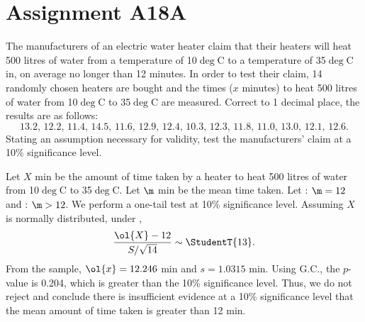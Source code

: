 \section{Assignment A18A}

\begin{problem}
    The manufacturers of an electric water heater claim that their heaters will heat 500 litres of water from a temperature of 10$\deg$C to a temperature of 35$\deg$C in, on average no longer than 12 minutes. In order to test their claim, 14 randomly chosen heaters are bought and the times ($x$ minutes) to heat 500 litres of water from 10$\deg$C to 35$\deg$C are measured. Correct to 1 decimal place, the results are as follows: \[13.2, \, 12.2, \, 11.4, \, 14.5, \, 11.6, \, 12.9, \, 12.4, \, 10.3, \, 12.3, \, 11.8, \, 11.0, \, 13.0, \, 12.1, \, 12.6.\] Stating an assumption necessary for validity, test the manufacturers' claim at a 10\% significance level.
\end{problem}
\begin{solution}
    Let $X$ min be the amount of time taken by a heater to heat 500 litres of water from 10$\deg$C to 35$\deg$C. Let $\m$ min be the mean time taken. Let \nullhyp: $\m = 12$ and \althyp: $\m > 12$. We perform a one-tail test at 10\% significance level. Assuming $X$ is normally distributed, under \nullhyp, \[\frac{\ol{X} - 12}{S/\sqrt{14}} \sim \StudentT{13}.\] From the sample, $\ol{x} = 12.246$ min and $s = 1.0315$ min. Using G.C., the $p$-value is 0.204, which is greater than the 10\% significance level. Thus, we do not reject \nullhyp{} and conclude there is insufficient evidence at a 10\% significance level that the mean amount of time taken is greater than 12 min.
\end{solution}

